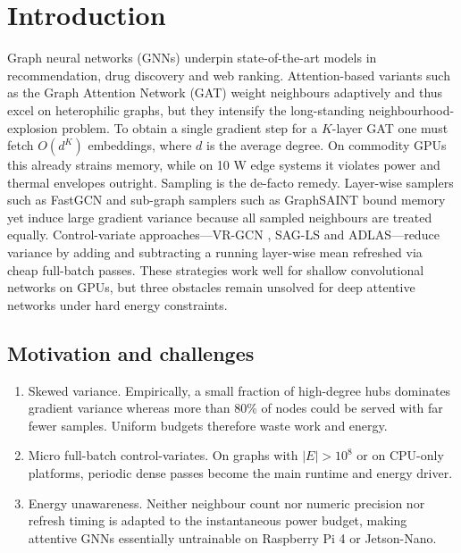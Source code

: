 \documentclass{article}
\begin{document}
\section{Introduction}
Graph neural networks (GNNs) underpin state-of-the-art models in recommendation, drug discovery and web ranking. Attention-based variants such as the Graph Attention Network (GAT) weight neighbours adaptively and thus excel on heterophilic graphs, but they intensify the long-standing neighbourhood-explosion problem. To obtain a single gradient step for a \(K\)-layer GAT one must fetch \(O(d^K)\) embeddings, where \(d\) is the average degree. On commodity GPUs this already strains memory, while on 10 W edge systems it violates power and thermal envelopes outright. Sampling is the de-facto remedy. Layer-wise samplers such as FastGCN \cite{chen-2018-fastgcn} and sub-graph samplers such as GraphSAINT \cite{zeng-2019-graphsaint} bound memory yet induce large gradient variance because all sampled neighbours are treated equally. Control-variate approaches—VR-GCN \cite{chen-2017-stochastic}, SAG-LS and ADLAS—reduce variance by adding and subtracting a running layer-wise mean refreshed via cheap full-batch passes. These strategies work well for shallow convolutional networks on GPUs, but three obstacles remain unsolved for deep attentive networks under hard energy constraints.
\subsection{Motivation and challenges}
\begin{enumerate}
  \item Skewed variance. Empirically, a small fraction of high-degree hubs dominates gradient variance whereas more than 80\% of nodes could be served with far fewer samples. Uniform budgets therefore waste work and energy.
  \item Micro full-batch control-variates. On graphs with \(|E|>10^8\) or on CPU-only platforms, periodic dense passes become the main runtime and energy driver.
  \item Energy unawareness. Neither neighbour count nor numeric precision nor refresh timing is adapted to the instantaneous power budget, making attentive GNNs essentially untrainable on Raspberry Pi 4 or Jetson-Nano.
\end{enumerate}
\end{document}
